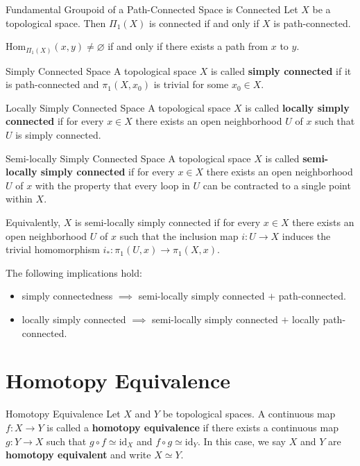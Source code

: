 \documentclass{report}
\newcommand{\Hom}{\mathrm{Hom}}
\begin{document}
\begin{proposition}{Fundamental Groupoid of a Path-Connected Space is Connected}{}
	Let $X$ be a topological space. Then $\Pi_1(X)$ is connected if and only if $X$ is path-connected.
\end{proposition}

\begin{prf}
	$\Hom_{\Pi_1(X)}(x,y)\ne \varnothing$ if and only if there exists a path from $x$ to $y$.
\end{prf}

\begin{definition}{Simply Connected Space}{}
	A topological space $X$ is called \textbf{simply connected} if it is path-connected and $\pi_1(X,x_0)$ is trivial for some $x_0\in X$.
\end{definition}

\begin{definition}{Locally Simply Connected Space}{}
	A topological space $X$ is called \textbf{locally simply connected} if for every $x\in X$ there exists an open
	neighborhood $U$ of $x$ such that $U$ is simply connected.
\end{definition}

\begin{definition}{Semi-locally Simply Connected Space}{}
	A topological space $X$ is called \textbf{semi-locally simply connected} if for every $x\in X$ there exists an open neighborhood $U$ of $x$ with the property that every loop in $U$ can be contracted to a single point within $X$.

	Equivalently, $X$ is semi-locally simply connected if for every $x\in X$ there exists an open neighborhood $U$ of $x$ such that the inclusion map $i:U\to X$ induces the trivial homomorphism $i_*:\pi_1(U,x)\to \pi_1(X,x)$.

\end{definition}

\begin{proposition}{}{}
	The following implications hold:
	\begin{itemize}
		\item simply connectedness $\implies$ semi-locally simply connected $+$ path-connected.
		\item locally simply connected $\implies$ semi-locally simply connected $+$ locally path-connected.
	\end{itemize}
\end{proposition}

\section{Homotopy Equivalence}
\begin{definition}{Homotopy Equivalence}{}
	Let $X$ and $Y$ be topological spaces. A continuous map $f:X\to Y$ is called a \textbf{homotopy equivalence} if there exists a continuous map $g:Y\to X$ such that $g\circ f\simeq \mathrm{id}_X$ and $f\circ g\simeq \mathrm{id}_Y$. In this case, we say $X$ and $Y$ are \textbf{homotopy equivalent} and write $X\simeq Y$.
\end{definition}
\end{document}

